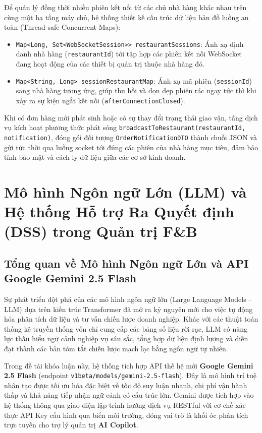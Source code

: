 \documentclass{uetgraduation}
\begin{document}
Để quản lý đồng thời nhiều phiên kết nối từ các chủ nhà hàng khác nhau trên cùng một hạ tầng máy chủ, hệ thống thiết kế cấu trúc dữ liệu bản đồ luồng an toàn (Thread-safe Concurrent Maps):
\begin{itemize}
    \item \texttt{Map<Long, Set<WebSocketSession>> restaurantSessions}: Ánh xạ định danh nhà hàng (\texttt{restaurantId}) tới tập hợp các phiên kết nối WebSocket đang hoạt động của các thiết bị quản trị thuộc nhà hàng đó.
    \item \texttt{Map<String, Long> sessionRestaurantMap}: Ánh xạ mã phiên (\texttt{sessionId}) sang nhà hàng tương ứng, giúp thu hồi và dọn dẹp phiên rác ngay tức thì khi xảy ra sự kiện ngắt kết nối (\texttt{afterConnectionClosed}).
\end{itemize}

Khi có đơn hàng mới phát sinh hoặc có sự thay đổi trạng thái giao vận, tầng dịch vụ kích hoạt phương thức phát sóng \texttt{broadcastToRestaurant(restaurantId, notification)}, đóng gói đối tượng \texttt{OrderNotificationDTO} thành chuỗi JSON và gửi tức thời qua luồng socket tới đúng các phiên của nhà hàng mục tiêu, đảm bảo tính bảo mật và cách ly dữ liệu giữa các cơ sở kinh doanh.

\section{Mô hình Ngôn ngữ Lớn (LLM) và Hệ thống Hỗ trợ Ra Quyết định (DSS) trong Quản trị F\&B}
\subsection{Tổng quan về Mô hình Ngôn ngữ Lớn và API Google Gemini 2.5 Flash}
Sự phát triển đột phá của các mô hình ngôn ngữ lớn (Large Language Models -- LLM) dựa trên kiến trúc Transformer đã mở ra kỷ nguyên mới cho việc tự động hóa phân tích dữ liệu và tư vấn chiến lược doanh nghiệp. Khác với các thuật toán thống kê truyền thống vốn chỉ cung cấp các bảng số liệu rời rạc, LLM có năng lực thấu hiểu ngữ cảnh nghiệp vụ sâu sắc, tổng hợp dữ liệu định lượng và diễn đạt thành các bản tóm tắt chiến lược mạch lạc bằng ngôn ngữ tự nhiên.

Trong đề tài khóa luận này, hệ thống tích hợp API thế hệ mới \textbf{Google Gemini 2.5 Flash} (endpoint \texttt{v1beta/models/gemini-2.5-flash}). Đây là mô hình trí tuệ nhân tạo được tối ưu hóa đặc biệt về tốc độ suy luận nhanh, chi phí vận hành thấp và khả năng tiếp nhận ngữ cảnh có cấu trúc lớn. Gemini được tích hợp vào hệ thống thông qua giao diện lập trình hướng dịch vụ RESTful với cơ chế xác thực API Key cấu hình qua biến môi trường, đóng vai trò là khối óc phân tích trực tuyến cho trợ lý quản trị \textbf{AI Copilot}.
\end{document}
